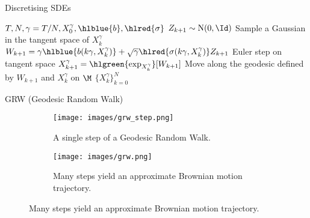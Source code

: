    
   
   \begin{frame}{Discretising SDEs}
   
   \begin{algorithm}[H]
   \begin{algorithmic}[1]
           \small
           \Require $T, N, \gamma = T / N, X_0^\gamma, \hlblue{b}, \hlred{\sigma}$
           \State $Z_{k+1} \sim \mathrm{N}(0, \Id)$ \Comment Sample a Gaussian in the tangent space of $X_{k}^\gamma$
           \State $W_{k+1} = \gamma \hlblue{b(k \gamma, X_k^\gamma)} + \sqrt{\gamma} \hlred{\sigma(k \gamma, X_k^\gamma)} Z_{k+1}$ \Comment Euler step on tangent space  %
           \State $X_{k+1}^\gamma = \hlgreen{\exp_{X_k^\gamma}}[W_{k+1}]$ \Comment Move along the geodesic defined by $W_{k+1}$ and $X_{k}^\gamma$ on $\M$
           \EndFor
            $\{ X_k^\gamma\}_{k=0}^{N}$
   \end{algorithmic}
   \caption{\small  GRW (Geodesic Random Walk)}
   \label{alg:grw}
   \end{algorithm}
   \vspace{-4.5em}
   
   \begin{figure}
       \centering
       \begin{subfigure}[t]{0.30\textwidth}
           \texttt{[image: images/grw\_step.png]}
           \caption{A single step of a Geodesic Random Walk.}
       \end{subfigure}
       \hspace{2em}
       \begin{subfigure}[t]{0.30\textwidth}
           \texttt{[image: images/grw.png]}
           \caption{Many steps yield an approximate Brownian motion trajectory.}
       \end{subfigure}
       \label{fig:grw}
   \end{figure}
   \end{frame}
   
